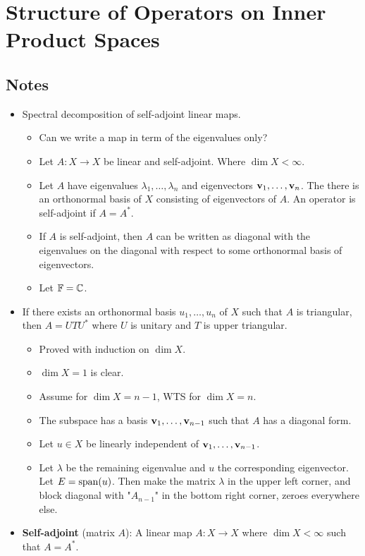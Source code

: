 \documentclass[../../notes.tex]{subfiles}
\begin{document}
\chapter{Structure of Operators on Inner Product Spaces}
\section{Notes}
\begin{itemize}
    \item {}Spectral decomposition of self-adjoint linear maps.
    \begin{itemize}
        \item Can we write a map in term of the eigenvalues only?
        \item Let $A:X\to X$ be linear and self-adjoint. Where $\dim X<\infty$.
        \item Let $A$ have eigenvalues $\lambda_1,\dots,\lambda_n$ and eigenvectors $\mathbf{v}_1,\dots,\mathbf{v}_n$. The there is an orthonormal basis of $X$ consisting of eigenvectors of $A$. An operator is self-adjoint if $A=A^*$.
        \item If $A$ is self-adjoint, then $A$ can be written as diagonal with the eigenvalues on the diagonal with respect to some orthonormal basis of eigenvectors.
        \item Let $\mathbb{F}=\mathbb{C}$.
    \end{itemize}
    \item If there exists an orthonormal basis $u_1,\dots,u_n$ of $X$ such that $A$ is triangular, then $A=UTU^*$ where $U$ is unitary and $T$ is upper triangular.
    \begin{itemize}
        \item Proved with induction on $\dim X$.
        \item $\dim X=1$ is clear.
        \item Assume for $\dim X=n-1$, WTS for $\dim X=n$.
        \item The subspace has a basis $\mathbf{v}_1,\dots,\mathbf{v}_{n-1}$ such that $A$ has a diagonal form.
        \item Let $u\in X$ be linearly independent of $\mathbf{v}_1,\dots,\mathbf{v}_{n-1}$.
        \item Let $\lambda$ be the remaining eigenvalue and $u$ the corresponding eigenvector. Let $E=\operatorname{span}(u)$. Then make the matrix $\lambda$ in the upper left corner, and block diagonal with "$A_{n-1}$" in the bottom right corner, zeroes everywhere else.
    \end{itemize}
    \item \textbf{Self-adjoint} (matrix $A$): A linear map $A:X\to X$ where $\dim X<\infty$ such that $A=A^*$.

\end{itemize}
\end{document}

